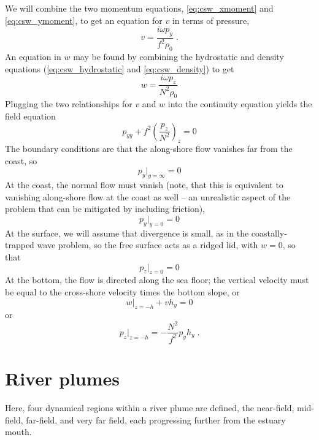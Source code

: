 \documentclass[11pt]{report}
\numberwithin{equation}{section}
\begin{document}
We will combine the two momentum equations, \ref{eq:csw_xmoment} and \ref{eq:csw_ymoment}, to get an equation for $v$ in terms of pressure,
\begin{equation}
    v = \frac{i \omega p_y}{f^2 \rho_0} \; .
\end{equation}
An equation in $w$ may be found by combining the hydrostatic and density equations (\ref{eq:csw_hydrostatic} and \ref{eq:csw_density}) to get
\begin{equation}
    w = \frac{i \omega p_z}{N^2 \rho_0}
\end{equation}
Plugging the two relationships for $v$ and $w$ into the continuity equation yields the field equation
\begin{equation}
    p_{yy} + f^2 \left( \frac{p_z}{N^2} \right)_z = 0
\end{equation}
The boundary conditions are that the along-shore flow vanishes far from the coast, so
\begin{equation}
    p_y\bigg|_{y=\infty} = 0
\end{equation}
At the coast, the normal flow must vanish (note, that this is equivalent to vanishing along-shore flow at the coast as well -- an unrealistic aspect of the problem that can be mitigated by including friction),
\begin{equation}
    p_y\bigg|_{y=0} = 0
\end{equation}
At the surface, we will assume that divergence is small, as in the coastally-trapped wave problem, so the free surface acts as a ridged lid, with $w=0$, so that
\begin{equation}
    p_z\bigg|_{z=0} = 0
\end{equation}
At the bottom, the flow is directed along the sea floor; the vertical velocity must be equal to the cross-shore velocity times the bottom slope, or
\begin{equation}
    w\bigg|_{z=-h} + v h_y = 0
\end{equation}
or
\begin{equation}
    p_z\bigg|_{z=-h} = - \frac{N^2}{f^2} p_y h_y \; .
\end{equation}




\section{River plumes}

Here, four dynamical regions within a river plume are defined, the near-field, mid-field, far-field, and very far field, each progressing further from the estuary mouth.
\end{document}
